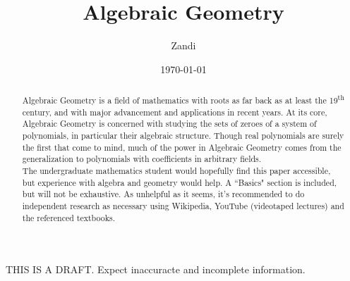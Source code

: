\documentclass[draft]{article}
\begin{document}
\title{Algebraic Geometry}
\author{Zandi} %
\date{\today}
\maketitle

THIS IS A DRAFT. Expect inaccuracte and incomplete information.

\begin{abstract}
Algebraic Geometry is a field of mathematics with roots as far back as
at least the 19\textsuperscript{th} century, and with major advancement and applications
in recent years. At its core, Algebraic Geometry is concerned with 
studying the sets of zeroes of a system of polynomials, in particular 
their algebraic structure. Though real polynomials are surely the first
that come to mind, much of the power in Algebraic Geometry comes from the
generalization to polynomials with coefficients in arbitrary fields.\\

The undergraduate mathematics student would hopefully find this paper accessible,
but experience with algebra and geometry would help. A ``Basics" section is included,
but will not be exhaustive. As unhelpful as it seems, it's recommended to 
do independent research as necessary using Wikipedia, YouTube (videotaped lectures)
and the referenced textbooks.
\end{abstract}






\end{document}
